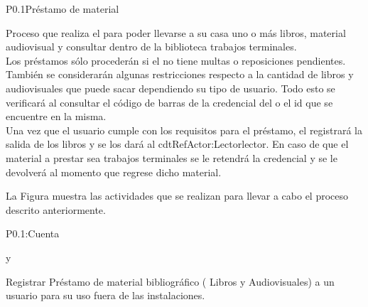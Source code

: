 
\begin{Proceso}{P0.1}{Préstamo de material} {
  

  Proceso que realiza el  para poder llevarse a su casa uno o más libros, material audiovisual y consultar dentro de la biblioteca  trabajos terminales.\\
  
Los préstamos sólo procederán si el  no tiene multas o reposiciones pendientes. También se considerarán algunas restricciones respecto a la cantidad de libros y audiovisuales que puede sacar dependiendo su tipo de usuario. Todo esto se verificará al consultar el código de barras de la credencial del  o el id que se encuentre en la misma.\\
  Una vez que el usuario cumple con los requisitos para el préstamo, el  
  registrará la salida de los libros y se los dará al cdtRef{Actor:Lector}{lector}. En caso de que el material a prestar sea trabajos terminales se le retendrá la credencial y se le devolverá al momento que regrese dicho material. 
  

  \noindent La Figura  muestra las actividades que se realizan para llevar a cabo el proceso descrito anteriormente.


} {P0.1:Cuenta}


   { %
      y  
  }

   { %
	Registrar Préstamo de material bibliográfico ( Libros y Audiovisuales) a un usuario para su uso fuera de las instalaciones.  
  }


\end{Proceso}
